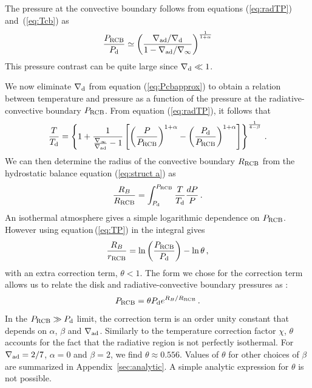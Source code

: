 \documentclass[apj]{emulateapj}
\newcommand{\delad}{\nabla_{\rm ad}}
\newcommand{\Eq}[1]{equation\,(\ref{#1})}
\newcommand{\Eqs}[2]{equations (\ref{#1}) and~(\ref{#2})}
\newcommand{\App}[1]{Appendix~\ref{#1}}
\newcommand{\di}{_{\rm d}}
\newcommand{\cb}{_{\rm RCB}}
\begin{document}

The pressure at the convective boundary  follows from \Eqs{eq:radTP}{eq:Tcb} as
\begin{equation}
\label{eq:Pcbapprox}
{P\cb\over P_{\rm d}} \simeq \left({\delad/\nabla\di \over 1 - \delad/\nabla_\infty}\right)^{1 \over 1 + \alpha}
\end{equation} 
This pressure contrast can be quite large since $\nabla_{\rm d} \ll 1$.
 
 We now eliminate $\nabla\di$ from equation (\ref{eq:Pcbapprox}) to obtain a relation between temperature and pressure as a function of the pressure at the radiative-convective boundary $P\cb$. From equation (\ref{eq:radTP}), it follows that
 \begin{equation}\label{eq:TP}
{T \over T_{\rm d}} = \left\{1 + {1 \over {\nabla_\infty \over \delad} - 1} \left[ \left({P \over P\cb}\right)^{1+\alpha} -  \left({P_{\rm d} \over P\cb}\right)^{1+\alpha}  \right] \right\}^{1 \over 4-\beta}\, .
\end{equation} 
 We can then determine the radius of the convective boundary $R\cb$ from the hydrostatic balance equation (\ref{eq:struct a}) as 
\begin{equation}\label{eq:RCBint}
{R_B \over R\cb} = \int_{P\di}^{P\cb} {T \over T_{\rm d}} {dP \over P}\, .
\end{equation} 
An isothermal atmosphere gives a simple logarithmic dependence on $P\cb$.  However using \Eq{eq:TP} in the integral gives
\begin{equation}\label{eq:Rcb}
{R_B \over r\cb} = \ln \left(P\cb \over P\di \right) - \ln \theta \, ,
\end{equation} 
with an extra correction term, $\theta < 1$.  The form we chose for the correction term allows us to relate the disk and radiative-convective boundary pressures as :
 \begin{equation}\label{eq:PcbRcb}
P\cb = \theta P_{\rm d} e^{R_B/R\cb} \, .
\end{equation}   
In the $P\cb \gg P_{\rm d}$ limit, the correction term is an order unity constant that depends on $\alpha$, $\beta$ and $\delad$. Similarly to the temperature correction factor $\chi$,  $\theta$ accounts for the fact that the radiative region is not perfectly isothermal. For $\delad=2/7$, $\alpha=0$ and $\beta=2$, we find $\theta \approx 0.556$. Values of $\theta$ for other choices of $\beta$ are summarized in \App{sec:analytic}.  A simple analytic expression for $\theta$ is not possible.  
\end{document}
